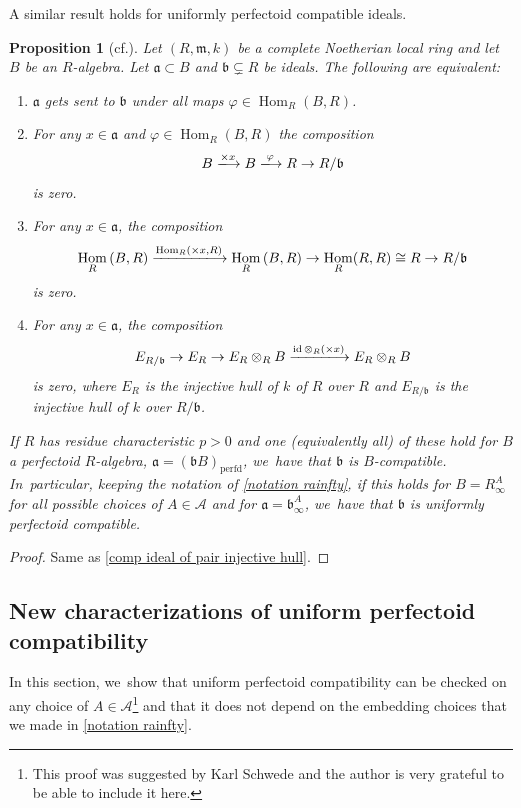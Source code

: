 \documentclass[11pt]{article}
\newcommand{\cf}{cf.\xspace}
\let\autoref\cref
\theoremstyle{plain}
\newtheorem{proposition}[theorem]{Proposition}
\theoremstyle{definition}
\numberwithin{equation}{theorem}
\let\tensor\otimes
\newcommand{\fra}{\mathfrak{a}}
\newcommand{\frab}{\mathfrak{b}}
\newcommand{\fram}{\mathfrak{m}}
\DeclareMathOperator{\Hom}{Hom}
\DeclareMathOperator{\id}{{id}}
\newcommand{\perfd}{_{\mathrm{perfd}}}
\newcommand{\sA}{\mathcal{A}}
\renewcommand{\phi}{\varphi}
\newcommand{\rafty}{R^A_\infty}
\begin{document}
A similar result holds for uniformly perfectoid compatible ideals.

\begin{proposition}[{\cf \cite[Lem.\,5.1]{SchwedeCentersOfFPurity}}]\label{uniformly compatible injective hull}
Let $(R,\fram,k)$ be a complete Noetherian local ring and let $B$ be an $R$\nobreakdash-algebra.
Let $\fra\subset B$ and $\frab \subsetneq R$ be ideals. The following are equivalent:
\begin{enumerate}
\item $\fra$ gets sent to $\frab$ under all maps $\phi\in \Hom_R(B,R)$.
\item For any $x\in \fra$ and $\phi \in \Hom_R(B,R)$ the composition
\[
B \xlongrightarrow{\times x} B \xlongrightarrow{\phi} R \to R/\frab
\]
is zero.
\item For any $x\in \fra$, the composition
\[
\Hom_R\left(B,R\right)\xlongrightarrow{\Hom_R(\times x, R)}\Hom_R\left(B,R\right) \to \Hom_R(R,R)\cong R \to R/\frab
\]
is zero.
\item
For any $x\in \fra$, the composition
\[
E_{R/\frab} \to E_R \to E_R\tensor_R B \xlongrightarrow{\id\tensor_R (\times x)} E_R\tensor_R B
\]
is zero, where $E_R$ is the injective hull of $k$ of $R$ over $R$ and $E_{R/\frab} $ is the injective hull of $k$ over $R/\frab$.
\end{enumerate}

If $R$ has residue characteristic $p>0$ and one (equivalently all) of these hold for $B$ a perfectoid $R$\nobreakdash-algebra, $\fra=(\frab B)\perfd$, we~have that $\frab$ is $B$-compatible. In~particular, keeping the notation of \autoref{notation rainfty},
if this holds for $B=\rafty$ for all possible
choices of $A\in \sA$ and for $\fra=\frab^A_\infty$, we~have that $\frab$ is uniformly perfectoid compatible.
\end{proposition}

\begin{proof}
Same as \autoref{comp ideal of pair injective hull}.
\end{proof}

\subsection{New characterizations of uniform perfectoid compatibility} In this section, we~show that uniform perfectoid compatibility can be checked on any choice of $A\in \sA$\footnote{
This proof was suggested by Karl Schwede and the author is very grateful to be able to include it here.} and that it does not depend on the embedding choices that we made in \autoref{notation rainfty}.
\smallskip
\end{document}
